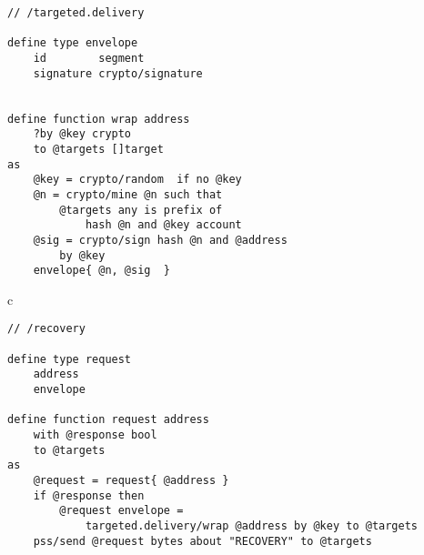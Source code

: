 
\begin{definition}\label{def:targeted-delivery}
\begin{lstlisting}[language=buzz1]
// /targeted.delivery

define type envelope
    id        segment
    signature crypto/signature


define function wrap address
    ?by @key crypto
    to @targets []target
as
    @key = crypto/random  if no @key
    @n = crypto/mine @n such that
        @targets any is prefix of
            hash @n and @key account
    @sig = crypto/sign hash @n and @address 
        by @key 
    envelope{ @n, @sig  }            

\end{lstlisting}
\end{definition}

\begin{definition}\label{def:recovery-request}
c\begin{lstlisting}[language=buzz1]
// /recovery

define type request
    address
    envelope
    
define function request address
    with @response bool
    to @targets 
as  
    @request = request{ @address }
    if @response then
        @request envelope =
            targeted.delivery/wrap @address by @key to @targets
    pss/send @request bytes about "RECOVERY" to @targets
    
    

\end{lstlisting}
\end{definition}

\begin{definition}\label{def:recovery}
\begin{lstlisting}[language=buzz1]


    

\end{lstlisting}
\end{definition}